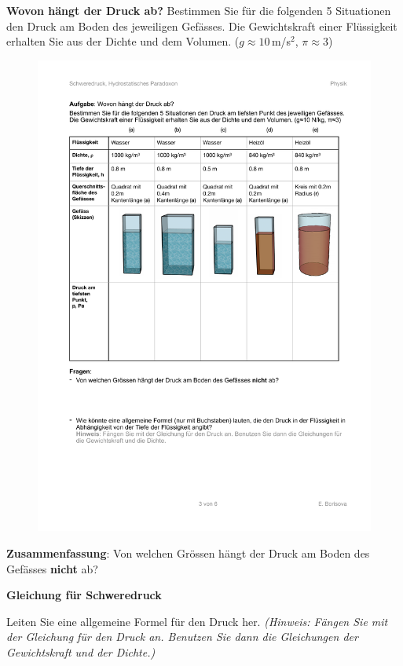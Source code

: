 \documentclass[11pt]{article}
\begin{document}
\textbf{Wovon hängt der Druck ab?} Bestimmen Sie für die folgenden 5 Situationen den Druck am Boden des jeweiligen Gefässes. Die Gewichtskraft einer Flüssigkeit erhalten Sie aus der Dichte und dem Volumen. ($g\approx 10\,$m/s$^2$, $\pi \approx 3$)

\begin{figure}[h!]
    \centering
    \includegraphics[width=\textwidth]{images/03_Dichte_Aufgabe.pdf}
    \label{Dichte}
\end{figure}

\vfill
\textbf{Zusammenfassung}: Von welchen Grössen hängt der Druck am Boden des Gefässes \textbf{nicht} ab? \vspace{2cm}

\newpage
\textbf{Gleichung für Schweredruck}

Leiten Sie eine allgemeine Formel für den Druck her. \textit{(Hinweis: Fängen Sie mit der Gleichung für den Druck an. Benutzen Sie dann die Gleichungen der Gewichtskraft und der Dichte.)}
\end{document}
